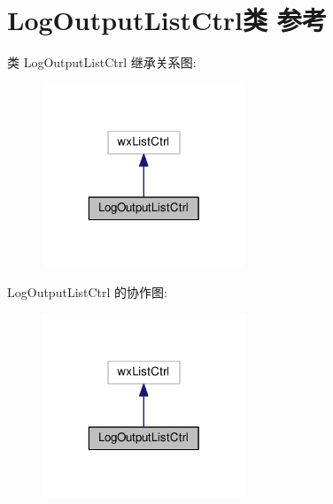 \hypertarget{class_log_output_list_ctrl}{\section{Log\+Output\+List\+Ctrl类 参考}
\label{class_log_output_list_ctrl}
}


类 Log\+Output\+List\+Ctrl 继承关系图\+:
\nopagebreak
\begin{figure}[H]
\begin{center}
\leavevmode
\includegraphics[width=172pt]{class_log_output_list_ctrl__inherit__graph}
\end{center}
\end{figure}


Log\+Output\+List\+Ctrl 的协作图\+:
\nopagebreak
\begin{figure}[H]
\begin{center}
\leavevmode
\includegraphics[width=172pt]{class_log_output_list_ctrl__coll__graph}
\end{center}
\end{figure}
